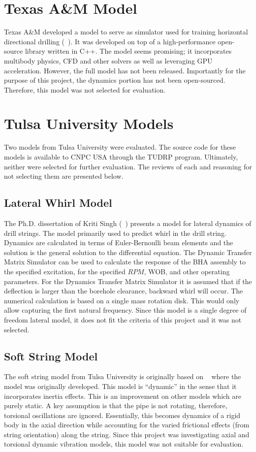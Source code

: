 \section{Texas A\&M Model}
Texas A\&M developed a model to serve as simulator used for training horizontal directional drilling (~\cite{ref:losoya2020a}).  It was developed on top of a high-performance open-source library written in C++.  The model seems promising; it incorporates multibody physics, CFD and other solvers as well as leveraging GPU acceleration.  However, the full model has not been released.  Importantly for the purpose of this project, the dynamics portion has not been open-sourced.  Therefore, this model was not selected for evaluation.

\section{Tulsa University Models}
Two models from Tulsa University were evaluated.  The source code for these models is available to CNPC USA through the TUDRP program. Ultimately, neither were selected for further evaluation.  The reviews of each and reasoning for not selecting them are presented below.

\subsection{Lateral Whirl Model}
The Ph.D. dissertation of Kriti Singh (~\cite{ref:singh2019a}) presents a model for lateral dynamics of drill  strings.  The model primarily used to predict whirl in the drill string.  Dynamics are calculated in terms of Euler-Bernoulli beam elements and the solution is the general solution to the differential equation.  The Dynamic Transfer Matrix Simulator can be used to calculate the response of the BHA assembly to the specified excitation, for the specified $RPM$, WOB, and other operating parameters.  For the Dynamics Transfer Matrix Simulator it is assumed that if the deflection is larger than the borehole clearance, backward whirl will occur.  The numerical calculation is based on a single mass rotation disk.  This would only allow capturing the first natural frequency.  Since this model is a single degree of freedom lateral model, it does not fit the criteria of this project and it was not selected.

\subsection{Soft String Model}
The soft string model from Tulsa University is originally based on ~\cite{ref:miska2015a} where the model was originally developed.  This model is ``dynamic'' in the sense that it incorporates inertia effects.  This is an improvement on other models which are purely static.  A key assumption is that the pipe is not rotating, therefore, torsional oscillations are ignored.  Essentially, this becomes dynamics of a rigid body in the axial direction while accounting for the varied frictional effects (from string orientation) along the string.  Since this project was investigating axial and torsional dynamic vibration models, this model was not suitable for evaluation.

